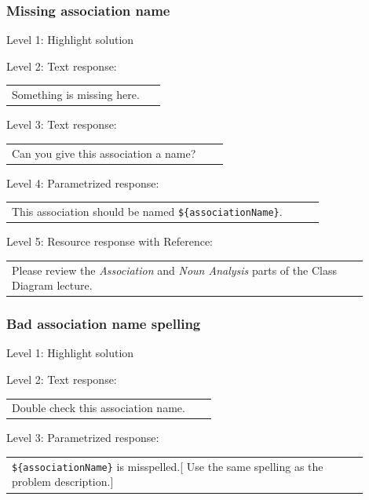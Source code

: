 \subsubsection{Missing association name}

\noindent Level 1: Highlight solution  \medskip

\noindent Level 2: Text response: \medskip

\begin{tabular}{|p{0.9\linewidth}}
Something is missing here.
\end{tabular} \medskip

\noindent Level 3: Text response: \medskip

\begin{tabular}{|p{0.9\linewidth}}
Can you give this association a name?
\end{tabular} \medskip

\noindent Level 4: Parametrized response: \medskip

\begin{tabular}{|p{0.9\linewidth}}
This association should be named \verb|${associationName}|.
\end{tabular} \medskip

\noindent Level 5: Resource response with Reference: \medskip

\begin{tabular}{|p{0.9\linewidth}}
Please review the \textit{Association} and \textit{Noun Analysis} parts of the Class Diagram lecture.
\end{tabular} \medskip


\subsubsection{Bad association name spelling}

\noindent Level 1: Highlight solution  \medskip

\noindent Level 2: Text response: \medskip

\begin{tabular}{|p{0.9\linewidth}}
Double check this association name.
\end{tabular} \medskip

\noindent Level 3: Parametrized response: \medskip

\begin{tabular}{|p{0.9\linewidth}}
\verb|${associationName}| is misspelled.[ Use the same spelling as the problem description.]
\end{tabular} \medskip

